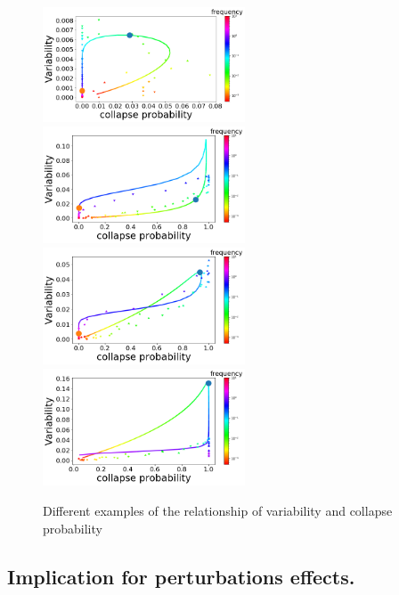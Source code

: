 \documentclass{article}
\begin{document}
\begin{figure}[h!]
\begin{center}
\includegraphics[width=6cm]{case_circle.png}
\includegraphics[width=6cm]{case_triangular.png}
\includegraphics[width=6cm]{case_linear.png}
\includegraphics[width=6cm]{case_clockwise.png}
\end{center}
\caption{\label{fig:temp}Different examples of the relationship of variability and collapse probability} %
\end{figure}





\newpage
\subsection{Implication for perturbations effects.}
\end{document}
